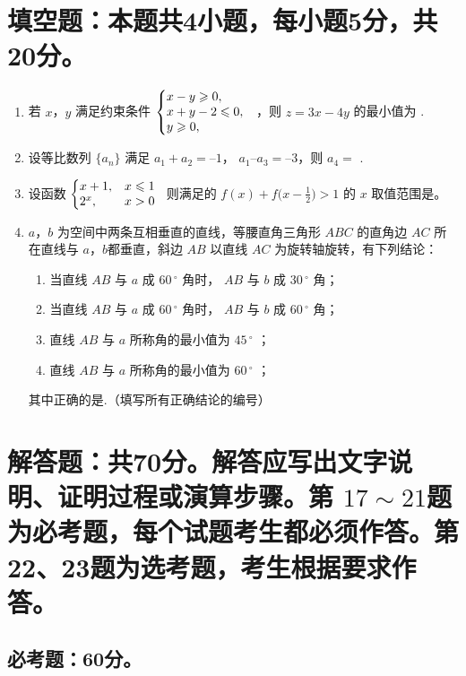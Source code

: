 \documentclass[11pt,space]{ctexart}
\begin{document}
\section{填空题：本题共4小题，每小题5分，共20分。}
\begin{enumerate}[itemsep=-0.3em,topsep=0pt,resume]%
	\item  若 $x$，$y$ 满足约束条件 $\left\{\begin{array}{@{}l}
	x-y\geqslant0,\\x+y-2\leqslant0,\\y\geqslant0,
	\end{array}\right.$
	，则 $z=3x-4y$ 的最小值为 \blank.
	\item 设等比数列 $\{a_n\}$ 满足 $a_1+a_2=–1$， $a_1–a_3=–3$，则 $a_4=$ \blank.
	\item 设函数 $\biggl\lbrace\begin{array}{@{}ll}
	x+1,&x\leqslant1\\2^x,&x>0
	\end{array}$ 则满足的 $f(x)+f\big(x-\tfrac{1}{2}\big)>1$ 的 $x$ 取值范围是\blank。
	\item $a$，$b$ 为空间中两条互相垂直的直线，等腰直角三角形 $ABC$ 的直角边 $AC$ 所在直线与 $a$，$b$都垂直，斜边 $AB$ 以直线 $AC$ 为旋转轴旋转，有下列结论：
	\begin{enumerate}[align=left,labelsep=-0.6em,leftmargin=1.2em,noitemsep,topsep=0pt]
		\item[\ding{172}] 当直线 $AB$ 与 $a$ 成 $60\,^{\circ}$ 角时， $AB$ 与 $b$ 成 $30\,^{\circ}$ 角；
		\item[\ding{173}] 当直线 $AB$ 与 $a$ 成 $60\,^{\circ}$ 角时， $AB$ 与 $b$ 成 $60\,^{\circ}$ 角；
		\item[\ding{174}] 直线 $AB$ 与 $a$ 所称角的最小值为 $45\,^{\circ}$ ；
		\item[\ding{175}] 直线 $AB$ 与 $a$ 所称角的最小值为 $60\,^{\circ}$ ；
	\end{enumerate}
	其中正确的是\blank.（填写所有正确结论的编号）
\end{enumerate}

\section{解答题：共70分。解答应写出文字说明、证明过程或演算步骤。第 $17\sim21$题为必考题，每个试题考生都必须作答。第22、23题为选考题，考生根据要求作答。}
\subsection{必考题：60分。}
\end{document}
